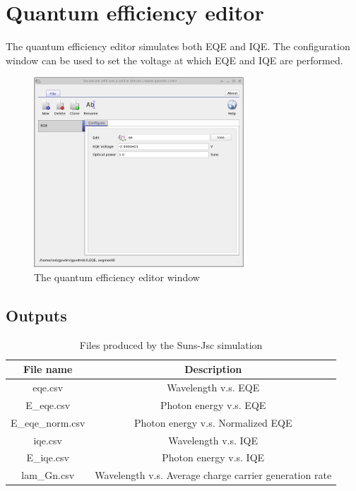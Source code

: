 \clearpage
\section{Quantum efficiency editor}
The quantum efficiency editor simulates both EQE and IQE.  The configuration window can be used to set the voltage at which EQE and IQE are performed.
\begin{figure}[H]
\centering
\includegraphics[width=0.7\textwidth,height=0.5\textwidth]{./images/sim_editors/qe_editor.png}
\caption{The quantum efficiency editor window}
\label{fig:qeeditor}
\end{figure}

\subsection{Outputs}

\begin{table}[H]
\begin{center}
\begin{tabular}{ |c|c| } 
 \hline
	File name 		& 	Description  \\ 
 \hline
	eqe.csv 		&	Wavelength v.s. EQE \\ 
	E\_eqe.csv		&	Photon energy v.s. EQE \\ 
	E\_eqe\_norm.csv	&	Photon energy v.s. Normalized EQE  \\ 
	iqe.csv			&	Wavelength v.s. IQE \\ 
	E\_iqe.csv		&	Photon energy v.s. IQE \\ 
	lam\_Gn.csv		&	Wavelength v.s. Average charge carrier generation rate \\ 
 \hline
\end{tabular}
\caption{Files produced by the Suns-Jsc simulation}
\label{tab:suns_jsc_output}
\end{center}
\end{table}
